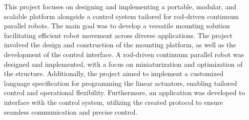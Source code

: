 \par This project focuses on designing and implementing a portable, modular, and scalable platform alongside a control system tailored for rod-driven continuum parallel robots. The main goal was to develop a versatile mounting solution facilitating efficient robot movement across diverse applications. The project involved the design and construction of the mounting platform, as well as the development of the control interface. A rod-driven continuum parallel robot was designed and implemented, with a focus on miniaturization and optimization of the structure. Additionally, the project aimed to implement a customized language specification for programming the linear actuators, enabling tailored control and operational flexibility. Furthermore, an application was developed to interface with the control system, utilizing the created protocol to ensure seamless communication and precise control.
